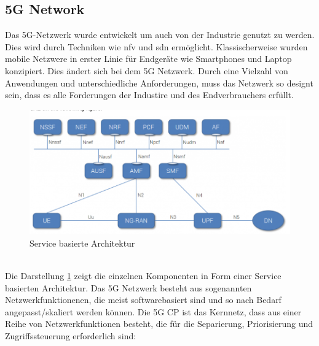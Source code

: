 \documentclass[runningheads]{llncs}
\numberwithin{figure}{section}
\begin{document}
\subsection{5G Network}
\label{subsec:5G Network}
Das 5G-Netzwerk wurde entwickelt um auch von der Industrie genutzt zu werden.
Dies wird durch Techniken wie \acrlong{nfv} und \acrlong{sdn} ermöglicht.
Klassischerweise wurden mobile Netzwere in erster Linie für Endgeräte wie Smartphones und Laptop konzipiert. 
Dies ändert sich bei dem 5G Netzwerk. Durch eine Vielzahl von Anwendungen und unterschiedliche Anforderungen,
muss das Netzwerk so designt sein, dass es alle Forderungen der Industire und des Endverbrauchers erfüllt. 
\begin{figure}
  \includegraphics[width=\linewidth]{images/ServiceBased5g.png}
  \caption{Service basierte Architektur}
  \label{fig:ServiceBased5g}
\end{figure}
\\
Die Darstellung \ref{fig:ServiceBased5g} zeigt die einzelnen Komponenten in Form einer Service basierten Architektur.  \cite{5GCoreNetwork2017}
Das 5G Netzwerk besteht aus sogenannten Netzwerkfunktionenen, die meist softwarebasiert sind und so nach Bedarf angepasst/skaliert werden können.
Die 5G CP ist das Kernnetz, dass aus einer Reihe von Netzwerkfunktionen besteht, 
die für die Separierung, Priorisierung und Zugriffssteuerung erforderlich sind:
\end{document}
